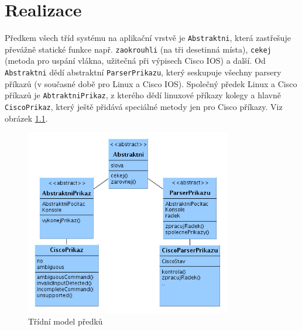 \chapter{Realizace} \label{realizace}


Předkem všech tříd systému na aplikační vrstvě je \verb|Abstraktni|, která zastřešuje převážně statické funkce např. \verb|zaokrouhli| (na tři desetinná místa), \verb|cekej| (metoda pro uspání vlákna, užitečná při výpisech Cisco IOS) a další. Od \verb|Abstraktni| dědí abstraktní \verb|ParserPrikazu|, který seskupuje všechny parsery příkazů (v současné době pro Linux a Cisco IOS). Společný předek Linux a Cisco příkazů je \verb|AbtraktniPrikaz|, z kterého dědí linuxové příkazy kolegy a hlavně \verb|CiscoPrikaz|, který ještě přidává speciálné metody jen pro Cisco příkazy. Viz obrázek \ref{uml:abstraktni}.

\begin{figure}[h]
\begin{center}
\includegraphics[width=9cm]{figures/uml_abtraktni.png}
\caption{Třídní model předků}
\label{uml:abstraktni}
\end{center}
\end{figure}

